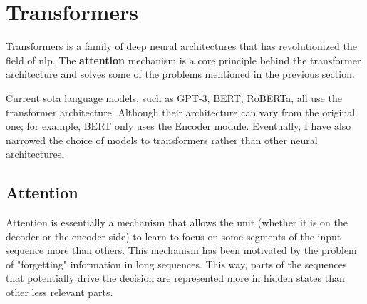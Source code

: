 \section{Transformers}\label{att_transformers}
Transformers \cite{vaswani2017attention} is a family of deep neural architectures that has revolutionized the field of \gls{nlp}. The \textbf{attention} mechanism is a core principle behind the transformer architecture and solves some of the problems mentioned in the previous section.

Current \gls{sota} language models, such as GPT-3, BERT, RoBERTa, all use the transformer architecture. Although their architecture can vary from the original one; for example, BERT only uses the Encoder module. Eventually, I have also narrowed the choice of models to transformers rather than other neural architectures.



\subsection{Attention}
Attention \cite{bahdanau2014neural,luongeffective} is essentially a mechanism that allows the unit (whether it is on the decoder or the encoder side) to learn to focus on some segments of the input sequence more than others. This mechanism has been motivated by the problem of "forgetting" information in long sequences. This way, parts of the sequences that potentially drive the decision are represented more in hidden states than other less relevant parts.

